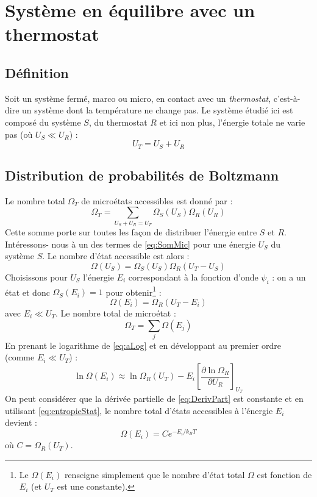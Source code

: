 \documentclass[british,french,11pt, a4paper, openany]{book}
\begin{document}
\chapter{Système en équilibre avec un thermostat}
\section{Définition}
Soit un système fermé, marco ou micro, en contact avec un \textit{thermostat}, c'est-à-dire
un système dont la température ne change pas. Le système étudié ici est composé du système 
$S$, du thermostat $R$ et ici non plus, l'énergie totale ne varie pas (où $U_S \ll U_R$) :
\begin{equation}
	U_T = U_S + U_R
\end{equation}

\section{Distribution de probabilités de Boltzmann}
Le nombre total $\Omega_T$ de microétats accessibles est donné par :
\begin{equation}
	\Omega_T = \sum_{U_S+U_R=U_T} \Omega_S(U_S)\Omega_R(U_R)
	\label{eq:SomMic}
\end{equation}
Cette somme porte sur toutes les façon de distribuer l'énergie entre $S$ et $R$. Intéressons-
nous à  un des termes de \autoref{eq:SomMic} pour une énergie $U_S$ du système $S$. Le nombre
d'état accessible est alors :
\begin{equation}
	\Omega(U_S) = \Omega_S(U_S)\Omega_R(U_T-U_S)
\end{equation}
Choisissons pour $U_S$ l'énergie $E_i$ correspondant à la fonction d'onde $\psi_i$ : on a un
état et donc $\Omega_S(E_i) = 1$ pour obtenir\footnote{Le $\Omega(E_i)$ renseigne simplement 
	que le nombre d'état total $\Omega$ est fonction de $E_i$ (et $U_T$ est une constante).} :
\begin{equation}
	\Omega(E_i) = \Omega_R(U_T-E_i)
	\label{eq:aLog}
\end{equation}
avec $E_i \ll U_T$. Le nombre total de microétat : 
\begin{equation}
	\Omega_T = \sum_j \Omega(E_j)
\end{equation}
En prenant le logarithme de \autoref{eq:aLog} et en développant au premier ordre (comme $E_i
\ll U_T$) :
\begin{equation}
	\ln\Omega(E_i) \approx \ln\Omega_R(U_T) - E_i\left[\dfrac{\partial \ln\Omega_R}{\partial U_R}
	\right]_{U_T}
	\label{eq:DerivPart}
\end{equation}
On peut considérer que la dérivée partielle de \autoref{eq:DerivPart} est constante et en 
utilisant \autoref{eq:entropieStat}, le nombre total d'états accessibles à l'énergie $E_i$ 
devient :
\begin{equation}
	\Omega(E_i) = Ce^{-E_i/k_BT}
\end{equation}
où $C = \Omega_R(U_T)$.\newpage
\end{document}
